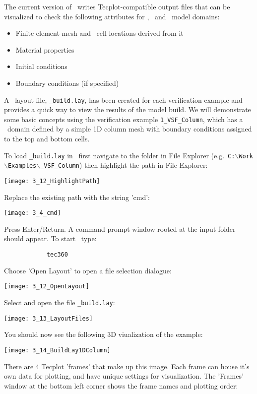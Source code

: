 The current version of \mut\ writes Tecplot-compatible output files that can be visualized to check the following attributes for \gwf, \swf\ and \cln\ model domains:
\begin{itemize}
  \item Finite-element mesh and \mfus\ cell locations derived from it
  \item Material properties
  \item Initial conditions
  \item Boundary conditions (if specified)
\end{itemize}

A \tecplot\ layout file, \texttt{\_build.lay}, has been created for each verification example and  provides a quick way to view the results of the model build.
We will demonstrate some basic concepts using the verification example \texttt{1\_VSF\_Column}, which has a \gwf\ domain defined by a simple 1D column mesh with boundary conditions assigned to the  top and bottom cells.

To load \texttt{\_build.lay} in \tecplot\ first navigate to the folder in File Explorer (e.g.\ \texttt{C:$\backslash$Work$\backslash$Examples$\backslash$\_VSF\_Column}) then highlight the path in File Explorer:

        \texttt{[image: 3\_12\_HighlightPath]}

Replace the existing path with the string 'cmd':

        \texttt{[image: 3\_4\_cmd]}

Press Enter/Return. A command prompt window rooted at the input folder should appear. To start \tecplot\, type:
        \begin{verbatim}
            tec360
        \end{verbatim}

Choose 'Open Layout' to open a file selection dialogue:

        \texttt{[image: 3\_12\_OpenLayout]}

Select and open the file \texttt{\_build.lay}:

        \texttt{[image: 3\_13\_LayoutFiles]}

You should now see the following 3D viualization of the example:

        \texttt{[image: 3\_14\_BuildLay1DColumn]}

There are 4 Tecplot 'frames' that make up this image.  Each frame can house it's own data for plotting, and have unique settings for visualization.  The 'Frames' window at the bottom left corner shows the frame names and plotting order:

